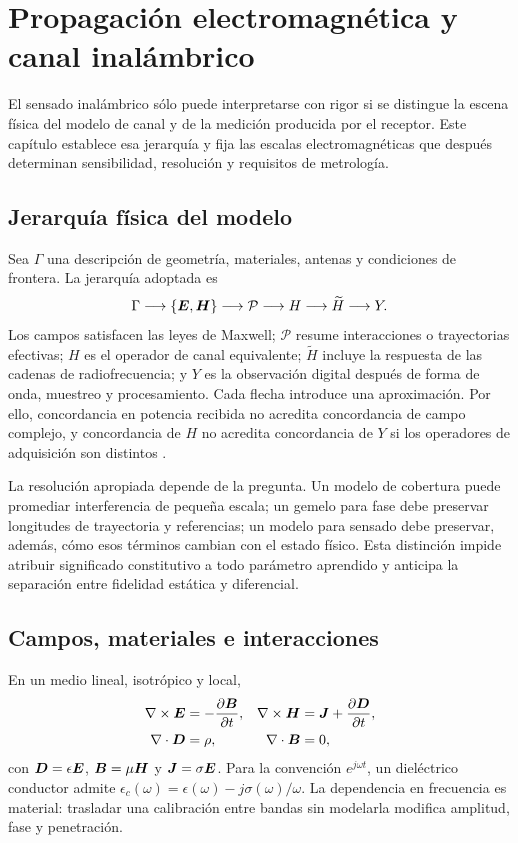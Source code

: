 \chapter{Propagación electromagnética y canal inalámbrico}
\label{ch:marco_canal}

El sensado inalámbrico sólo puede interpretarse con rigor si se distingue la escena
física del modelo de canal y de la medición producida por el receptor. Este capítulo
establece esa jerarquía y fija las escalas electromagnéticas que después determinan
sensibilidad, resolución y requisitos de metrología.

\section{Jerarquía física del modelo}

Sea $\Gamma$ una descripción de geometría, materiales, antenas y condiciones de
frontera. La jerarquía adoptada es
\[
\Gamma
\longrightarrow \{\bm{E},\bm{H}\}
\longrightarrow \mathcal P
\longrightarrow H
\longrightarrow \widetilde H
\longrightarrow Y.
\]
Los campos satisfacen las leyes de Maxwell; $\mathcal P$ resume interacciones o
trayectorias efectivas; $H$ es el operador de canal equivalente; $\widetilde H$
incluye la respuesta de las cadenas de radiofrecuencia; y $Y$ es la observación
digital después de forma de onda, muestreo y procesamiento. Cada flecha introduce
una aproximación. Por ello, concordancia en potencia recibida no acredita
concordancia de campo complejo, y concordancia de $H$ no acredita concordancia de
$Y$ si los operadores de adquisición son distintos \citep{Molisch2022,TseViswanath2005}.

La resolución apropiada depende de la pregunta. Un modelo de cobertura puede
promediar interferencia de pequeña escala; un gemelo para fase debe preservar
longitudes de trayectoria y referencias; un modelo para sensado debe preservar,
además, cómo esos términos cambian con el estado físico. Esta distinción impide
atribuir significado constitutivo a todo parámetro aprendido y anticipa la
separación entre fidelidad estática y diferencial.

\section{Campos, materiales e interacciones}

En un medio lineal, isotrópico y local,
\begin{align}
\nabla\times\bm{E}&=-\frac{\partial\bm{B}}{\partial t},&
\nabla\times\bm{H}&=\bm{J}+\frac{\partial\bm{D}}{\partial t},\\
\nabla\cdot\bm{D}&=\rho,&
\nabla\cdot\bm{B}&=0,
\end{align}
con $\bm{D}=\epsilon\bm{E}$, $\bm{B}=\mu\bm{H}$ y
$\bm{J}=\sigma\bm{E}$. Para la convención $e^{j\omega t}$, un dieléctrico
conductor admite $\epsilon_c(\omega)=\epsilon(\omega)-j\sigma(\omega)/\omega$.
La dependencia en frecuencia es material: trasladar una calibración entre bandas
sin modelarla modifica amplitud, fase y penetración.

